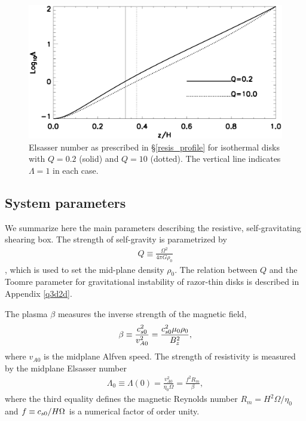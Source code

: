 
\begin{figure}
  \includegraphics[width=\linewidth]{figures/elsasser_iso}
  \caption{Elsasser number as prescribed in \S\ref{resis_profile} for
    isothermal disks with $Q=0.2$ (solid) 
    and $Q=10$ (dotted). The vertical line
    indicates $\Lambda=1$ in each case. \label{eqm_resis}}
\end{figure}


\subsection{System parameters}
We summarize here the main parameters describing the resistive,
self-gravitating shearing box. The strength of self-gravity is
parametrized by 
\begin{align}
  Q \equiv \frac{\Omega^2}{4\pi G\rho_0}
\end{align}
\citep{mamat10}, which is used to set the mid-plane density $\rho_0$. 
The relation between $Q$ and the Toomre parameter for gravitational
instability of razor-thin disks is described in Appendix \ref{q3d2d}. 

The plasma $\beta$ measures the inverse strength of the  
magnetic field, 
\begin{align}
  \beta \equiv \frac{c_{s0}^2}{v_{A0}^2} =
  \frac{c_{s0}^2\mu_0\rho_0}{B_z^2},  
\end{align}
where $v_{A0}$ is the midplane Alfven speed. The strength of
resistivity is measured by the midplane Elsasser number 
\begin{align}
  \Lambda_0 \equiv\Lambda(0) =  \frac{v_{A0}^2}{\eta_0\Omega} = \frac{f^2 R_m}{\beta}, 
\end{align}
where the third equality defines the magnetic Reynolds number
$R_m=H^2\Omega/\eta_0$ and $f\equiv c_{s0}/H\Omega$ is a numerical
factor of order unity. 

